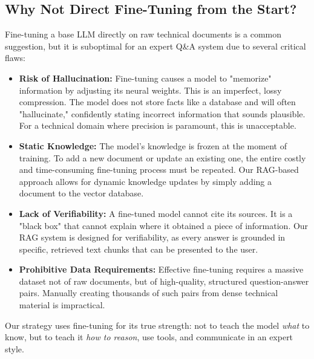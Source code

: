 \documentclass[11pt, a4paper]{article}
\begin{document}
\subsection{Why Not Direct Fine-Tuning from the Start?}
Fine-tuning a base LLM directly on raw technical documents is a common suggestion, but it is suboptimal for an expert Q\&A system due to several critical flaws:
\begin{itemize}
    \item \textbf{Risk of Hallucination:} Fine-tuning causes a model to "memorize" information by adjusting its neural weights. This is an imperfect, lossy compression. The model does not store facts like a database and will often "hallucinate," confidently stating incorrect information that sounds plausible. For a technical domain where precision is paramount, this is unacceptable.
    \item \textbf{Static Knowledge:} The model's knowledge is frozen at the moment of training. To add a new document or update an existing one, the entire costly and time-consuming fine-tuning process must be repeated. Our RAG-based approach allows for dynamic knowledge updates by simply adding a document to the vector database.
    \item \textbf{Lack of Verifiability:} A fine-tuned model cannot cite its sources. It is a "black box" that cannot explain where it obtained a piece of information. Our RAG system is designed for verifiability, as every answer is grounded in specific, retrieved text chunks that can be presented to the user.
    \item \textbf{Prohibitive Data Requirements:} Effective fine-tuning requires a massive dataset not of raw documents, but of high-quality, structured question-answer pairs. Manually creating thousands of such pairs from dense technical material is impractical.
\end{itemize}
Our strategy uses fine-tuning for its true strength: not to teach the model \textit{what} to know, but to teach it \textit{how to reason}, use tools, and communicate in an expert style.
\end{document}
